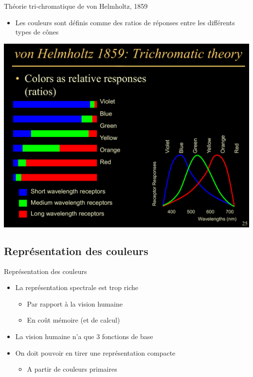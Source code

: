 \begin{frame}{Théorie tri-chromatique de von Helmholtz, 1859}
\begin{itemize}
\item Les couleurs sont définis comme des ratios de réponses entre les différents types de cônes
\end{itemize}
\begin{center}
\includegraphics[height=.7\textheight]{figs/couleurs}
\end{center}
\end{frame}

\subsection{Représentation des couleurs}

\begin{frame}{Représentation des couleurs}
\begin{itemize}
\item La représentation spectrale est trop riche
\begin{itemize}
\item Par rapport à la vision humaine
\item En coût mémoire (et de calcul)
\end{itemize}
\item La vision humaine n'a que 3 fonctions de base
\item On doit pouvoir en tirer une représentation compacte
\begin{itemize}
\item A partir de couleurs primaires
\end{itemize}
\end{itemize}
\end{frame}

